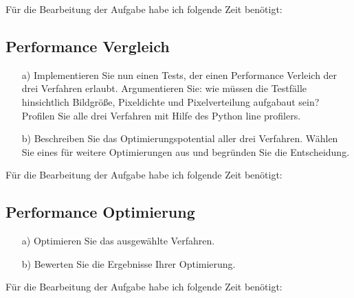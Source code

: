 Für die Bearbeitung der Aufgabe habe ich folgende Zeit benötigt:

\subsection{Performance Vergleich}

\begin{enumerate}

\item[a)] Implementieren Sie nun einen Tests, der einen Performance Verleich der drei Verfahren erlaubt. Argumentieren Sie: wie müssen die Testfälle hinsichtlich Bildgröße,  Pixeldichte und Pixelverteilung aufgabaut sein? Profilen Sie alle drei Verfahren mit Hilfe des Python line profilers. 

\item[b)] Beschreiben Sie das Optimierungspotential aller drei Verfahren. Wählen Sie eines für weitere Optimierungen aus und begründen Sie die Entscheidung.

\end{enumerate}

Für die Bearbeitung der Aufgabe habe ich folgende Zeit benötigt:

\subsection{Performance Optimierung}

\begin{enumerate}

\item[a)] Optimieren Sie das ausgewählte Verfahren. 

\item[b)] Bewerten Sie die Ergebnisse Ihrer Optimierung. 

\end{enumerate}

Für die Bearbeitung der Aufgabe habe ich folgende Zeit benötigt:

